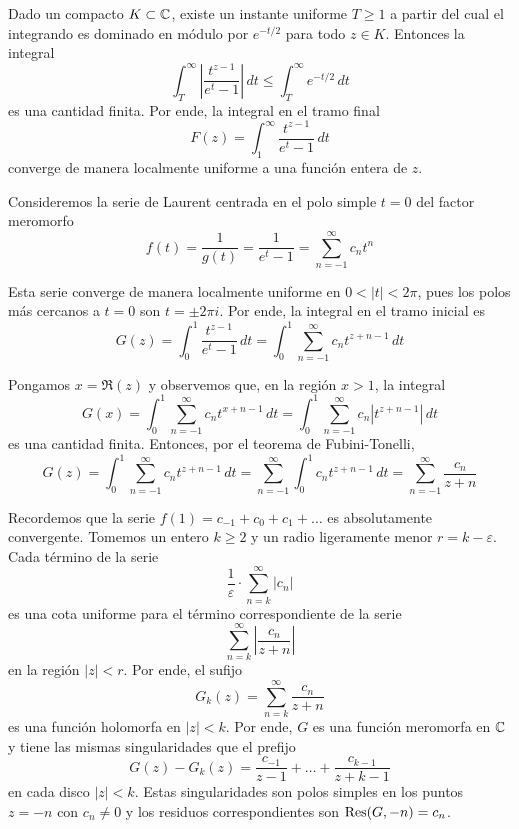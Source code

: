 \begin{solution}
\begin{enumerate}[label=\alph*)]
\begin{enumerate}[label=\arabic*)]
        Dado un compacto $K \subset \mathbb C$, existe un instante uniforme $T \ge 1$ a partir del cual el integrando es dominado en módulo por $e^{-t/2}$ para todo $z \in K$. Entonces la integral
        $$\int_T^\infty \left| \frac {t^{z-1}} {e^t - 1} \right| \, dt \le \int_T^\infty e^{-t/2} \, dt$$
        es una cantidad finita. Por ende, la integral en el tramo final
        $$F(z) = \int_1^\infty \frac {t^{z-1}} {e^t - 1} \, dt$$
        converge de manera localmente uniforme a una función entera de $z$.
        
        Consideremos la serie de Laurent centrada en el polo simple $t = 0$ del factor meromorfo
        $$f(t) = \frac 1 {g(t)} = \frac 1 {e^t - 1} = \sum_{n=-1}^\infty c_n t^n$$
        
        Esta serie converge de manera localmente uniforme en $0 < |t| < 2\pi$, pues los polos más cercanos a $t = 0$ son $t = \pm 2\pi i$. Por ende, la integral en el tramo inicial es
        $$G(z) = \int_0^1 \frac {t^{z-1}} {e^t - 1} \, dt = \int_0^1 \sum_{n=-1}^\infty c_n t^{z+n-1} \, dt$$
        
        Pongamos $x = \Re(z)$ y observemos que, en la región $x > 1$, la integral
        $$
        G(x)
            = \int_0^1 \sum_{n=-1}^\infty c_n t^{x+n-1} \, dt
            = \int_0^1 \sum_{n=-1}^\infty c_n \left| t^{z+n-1} \right| \, dt
        $$
        es una cantidad finita. Entonces, por el teorema de Fubini-Tonelli,
        $$
        G(z)
            = \int_0^1 \sum_{n=-1}^\infty c_n t^{z+n-1} \, dt
            = \sum_{n=-1}^\infty\int_0^1 c_n t^{z+n-1} \, dt
            = \sum_{n=-1}^\infty \frac {c_n} {z+n}
        $$
        
        Recordemos que la serie $f(1) = c_{-1} + c_0 + c_1 + \dots$ es absolutamente convergente. Tomemos un entero $k \ge 2$ y un radio ligeramente menor $r = k - \varepsilon$. Cada término de la serie
        $$\frac 1 \varepsilon \cdot \sum_{n=k}^\infty |c_n|$$
        es una cota uniforme para el término correspondiente de la serie
        $$\sum_{n=k}^\infty \left| \frac {c_n} {z+n} \right|$$
        en la región $|z| < r$. Por ende, el sufijo
        $$G_k(z) = \sum_{n=k}^\infty \frac {c_n} {z+n}$$
        es una función holomorfa en $|z| < k$. Por ende, $G$ es una función meromorfa en $\mathbb C$ y tiene las mismas singularidades que el prefijo
        $$G(z) - G_k(z) = \frac {c_{-1}} {z-1} + \dots + \frac {c_{k-1}} {z+k-1}$$
        en cada disco $|z| < k$. Estas singularidades son polos simples en los puntos $z = -n$ con $c_n \ne 0$ y los residuos correspondientes son $\operatorname{Res}(G, -n) = c_n$.
        

\end{enumerate}
\end{enumerate}
\end{solution}
